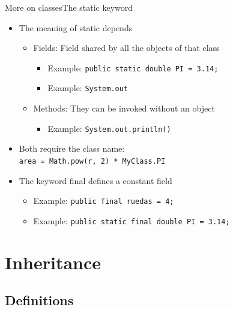 \documentclass[10pt,compress]{beamer} %
\begin{document}
\begin{frame}[shrink]{More on classes}{The static keyword}
	\begin{itemize}
		\item The meaning of \alert{static} depends
		\begin{itemize}
		\item Fields: Field shared by all the objects of that class
			\begin{itemize}
			\item Example: \texttt{public static double PI = 3.14;}
			\item Example: \texttt{System.out}
			\end{itemize}
		\item Methods: They can be invoked without an object
			\begin{itemize}
			\item Example: \texttt{System.out.println()}
			\end{itemize}
		\end{itemize}
		\item Both require the class name:\\\texttt{area = Math.pow(r, 2) * MyClass.PI}
		\item The keyword \alert{final} defines a constant field
		\begin{itemize}
		\item Example: \texttt{public final ruedas = 4;}
		\item Example: \texttt{public static final double PI = 3.14;}
		\end{itemize}

	\end{itemize}
\end{frame}

\section{Inheritance}
\subsection{Definitions}
\end{document}
